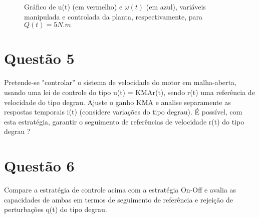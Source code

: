 \documentclass[11pt]{article}
\begin{document}
\begin{figure}[!htb]
        \caption{\label{fig:my-label} Gráfico de u(t) (em vermelho) e $\omega(t)$ (em azul), variáveis manipulada e controlada da planta, respectivamente, para $Q(t) = 5 N.m$}
      \end{figure}


\section{Questão 5}
Pretende-se "controlar” o sistema de velocidade do motor em malha-aberta, usando uma lei de
controle do tipo u(t) = KMAr(t), sendo r(t) uma referência de velocidade do tipo degrau. Ajuste o
ganho KMA e analise separamente as respostas temporais i(t) (considere variações do tipo degrau). É
possível, com esta estratégia, garantir o seguimento de referências de velocidade r(t) do tipo degrau
?
\section{Questão 6}
Compare a estratégia de controle acima com a estratégia On-Off e avalia as capacidades de ambas
em termos de seguimento de referência e rejeição de perturbações q(t) do tipo degrau.
\end{document}

